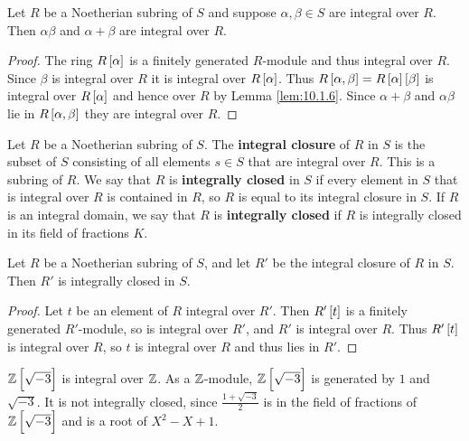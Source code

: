 \begin{corollary}
Let $ R $ be a Noetherian subring of $ S $ and suppose $ \alpha, \beta \in S $ are integral over $ R $. Then $ \alpha\beta $ and $ \alpha + \beta $ are integral over $ R $.
\end{corollary}

\begin{proof}
The ring $ R\sbr{\alpha} $ is a finitely generated $ R $-module and thus integral over $ R $. Since $ \beta $ is integral over $ R $ it is integral over $ R\sbr{\alpha} $. Thus $ R\sbr{\alpha, \beta} = R\sbr{\alpha}\sbr{\beta} $ is integral over $ R\sbr{\alpha} $ and hence over $ R $ by Lemma \ref{lem:10.1.6}. Since $ \alpha + \beta $ and $ \alpha\beta $ lie in $ R\sbr{\alpha, \beta} $ they are integral over $ R $.
\end{proof}


\begin{definition}
Let $ R $ be a Noetherian subring of $ S $. The \textbf{integral closure} of $ R $ in $ S $ is the subset of $ S $ consisting of all elements $ s \in S $ that are integral over $ R $. This is a subring of $ R $. We say that $ R $ is \textbf{integrally closed} in $ S $ if every element in $ S $ that is integral over $ R $ is contained in $ R $, so $ R $ is equal to its integral closure in $ S $. If $ R $ is an integral domain, we say that $ R $ is \textbf{integrally closed} if $ R $ is integrally closed in its field of fractions $ K $.
\end{definition}

\begin{lemma}
Let $ R $ be a Noetherian subring of $ S $, and let $ R' $ be the integral closure of $ R $ in $ S $. Then $ R' $ is integrally closed in $ S $.
\end{lemma}

\begin{proof}
Let $ t $ be an element of $ R $ integral over $ R' $. Then $ R'\sbr{t} $ is a finitely generated $ R' $-module, so is integral over $ R' $, and $ R' $ is integral over $ R $. Thus $ R'\sbr{t} $ is integral over $ R $, so $ t $ is integral over $ R $ and thus lies in $ R' $.
\end{proof}

\begin{example*}
$ \Z\sbr{\sqrt{-3}} $ is integral over $ \mathbb{Z} $. As a $ \mathbb{Z} $-module, $ \Z\sbr{\sqrt{-3}} $ is generated by $ 1 $ and $ \sqrt{-3} $. It is not integrally closed, since $ \tfrac{1 + \sqrt{-3}}{2} $ is in the field of fractions of $ \Z\sbr{\sqrt{-3}} $ and is a root of $ X^2 - X + 1 $.
\end{example*}

